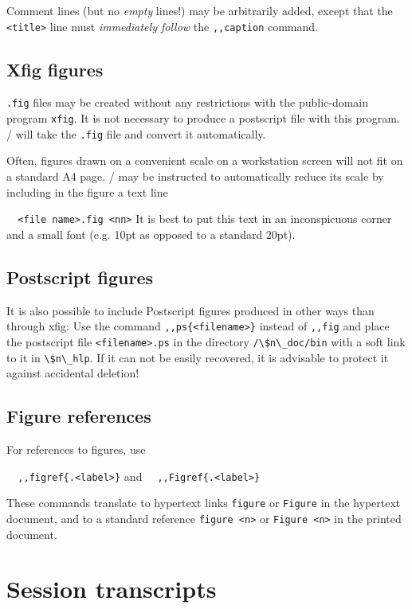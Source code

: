         Comment lines (but no {\em empty} lines!) may be arbitrarily added,
except that the \verb/<title>/ line must {\em immediately follow} the 
\verb/,,caption/ command. 


\subsection{ Xfig figures} 
\label{.xfig} 

        \verb/.fig/ files may be created without any restrictions with the
public-domain program \verb/xfig/. It is not necessary to produce a postscript
file with this program. \ndoc/ will take the \verb/.fig/ file and convert it
automatically. 

        Often, figures drawn on a convenient scale on a workstation screen will
not fit on a standard A4 page. \ndoc/ may be instructed to automatically reduce
its scale by including in the figure a text line 

\verb/  <file name>.fig <nn>/ %
It is best to put this text in an inconspicuous corner and a small font (e.g.
10pt as opposed to a standard 20pt). 


\subsection{ Postscript figures} 
\label{.ps} 

        It is also possible to include Postscript figures produced in other
ways than through xfig: Use the command \verb/,,ps{<filename>}/ instead of 
\verb/,,fig/ and place the postscript file \verb/<filename>.ps/ in the
directory \verb:/\$n\_doc/bin: with a soft link to it in \verb/\$n\_hlp/. If it
can not be easily recovered, it is advisable to protect it against accidental
deletion! 


\subsection{ Figure references} 
\label{.figref} 

        For references to figures, use 

\verb/  ,,figref{.<label>}/ and \verb/  ,,Figref{.<label>}/ 

\noi These commands translate to hypertext links \verb/figure/ or \verb/Figure/
in the hypertext document, and to a standard reference \verb/figure <n>/ or 
\verb/Figure <n>/ in the printed document. 


\section{ Session transcripts} 

